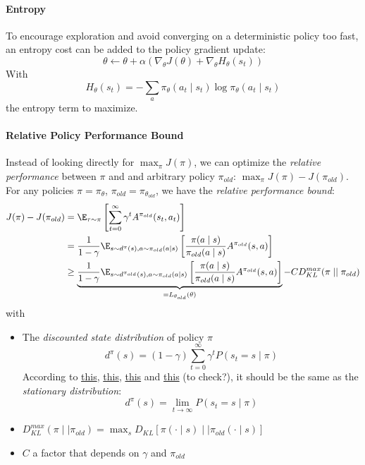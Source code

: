 \paragraph{Entropy}
To encourage exploration and avoid converging on a deterministic policy too fast, an entropy cost can be added to the policy gradient update: 
\[
    \theta \leftarrow \theta + \alpha (\nabla_\theta J(\theta) + \nabla_\theta H_\theta(s_t))
\]
With
\[
    H_\theta(s_t) = - \sum_a \pi_\theta(a_t\mid s_t) \log \pi_\theta(a_t\mid s_t)
\]
the entropy term to maximize.

\paragraph{Relative Policy Performance Bound}
Instead of looking directly for $\max_\pi J(\pi)$, we can optimize the \emph{relative performance} between $\pi$ and and arbitrary policy $\pi_{old}$: $\max_\pi J(\pi) - J(\pi_{old})$. For any policies $\pi = \pi_\theta$, $\pi_{old} = \pi_{\theta_{old}}$, we have the \emph{relative performance bound}:
\begin{align}
    J(\pi) - J(\pi_{old}) 
    &= \E_{\tau \sim \pi} \left[ \sum_{t=0}^\infty \gamma^t A^{\pi_{old}}(s_t,a_t) \right] \nonumber\\
    &= \frac{1}{1-\gamma} \E_{s\sim d^\pi(s), a \sim \pi_{old}(a\mid s)} \left[ \frac{\pi(a\mid s)}{\pi_{old}(a\mid s)} A^{\pi_{old}}(s,a)\right] \nonumber\\
    &\geq \underbrace{\frac{1}{1-\gamma} \E_{s\sim d^{\pi_{old}}(s), a \sim \pi_{old}(a\mid s)} \left[ 
        \frac{\pi(a\mid s)}{\pi_{old}(a\mid s)} A^{\pi_{old}}(s,a)
    \right]}_{=L_{\theta_{old}}(\theta)} - C D_{KL}^{max}(\pi \mid \mid  \pi_{old})
    \label{eq:performance-bound}
\end{align}
with
\begin{itemize}
    \item The \emph{discounted state distribution} of policy $\pi$
    \begin{equation}
        d^\pi(s) = (1-\gamma) \sum_{t=0}^\infty \gamma^t P(s_{t}=s\mid \pi)
    \label{eq:stationary-state-distribution}
    \end{equation}
    According to \href{https://eva.fing.edu.uy/pluginfile.php/343525/mod_resource/content/1/modern_methods.pdf}{this}, \href{https://lilianweng.github.io/lil-log/2018/04/08/policy-gradient-algorithms.html#policy-gradient-theorem}{this}, \href{https://www.alexirpan.com/rl-derivations/#state-visitation--occupency-measure}{this} and \href{https://proceedings.neurips.cc//paper/2020/file/69bfa2aa2b7b139ff581a806abf0a886-Paper.pdf}{this} (to check?), it should be the same as the \emph{stationary distribution}:
    \[
        d^\pi(s) = \lim_{t\rightarrow \infty} P(s_t = s \mid \pi)
    \]
    \item $D_{KL}^{max}(\pi \mid \mid  \pi_{old}) = \max_s D_{KL}[\pi(\cdot\mid s) \mid \mid  \pi_{old}(\cdot\mid s)]$
    \item $C$ a factor that depends on $\gamma$ and $\pi_{old}$
\end{itemize}
